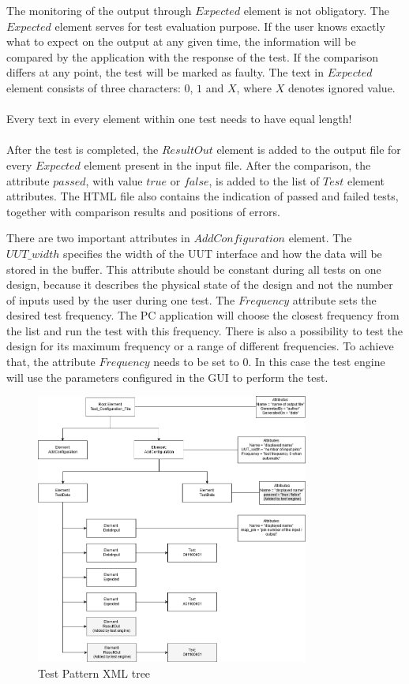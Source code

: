 The monitoring of the output through $Expected$ element is not obligatory. The $Expected$ element serves for test evaluation purpose. If the user knows exactly what to expect on the output at any given time, the information will be compared by the application with the response of the test. If the comparison differs at any point, the test will be marked as faulty. The text in $Expected$ element consists of three characters: $0$, $1$ and $X$, where $X$ denotes ignored value. 
\\\\
Every text in every element within one test needs to have equal length!
\\\\
After the test is completed, the $ResultOut$ element is added to the output file for every $Expected$ element present in the input file. After the comparison, the attribute $passed$, with value $true$ or $false$, is added to the list of $Test$ element attributes. The HTML file also contains the indication of passed and failed tests, together with comparison results and positions of errors.

There are two important attributes in $AddConfiguration$ element. The $UUT\_width$ specifies the width of the UUT interface and how the data will be stored in the buffer. This attribute should be constant during all tests on one design, because it describes the physical state of the design and not the number of inputs used by the user during one test. The $Frequency$ attribute sets the desired test frequency. The PC application will choose the closest frequency from the list and run the test with this frequency. There is also a possibility to test the design for its maximum frequency or a range of different frequencies. To achieve that, the attribute $Frequency$ needs to be set to $0$. In this case the test engine will use the parameters configured in the GUI to perform the test.

\begin{figure}[h]
\centering
\includegraphics[width=0.8\textwidth]{figures/XML_tree.png}
\caption{Test Pattern XML tree}
\label{fig:xml}
\end{figure}

